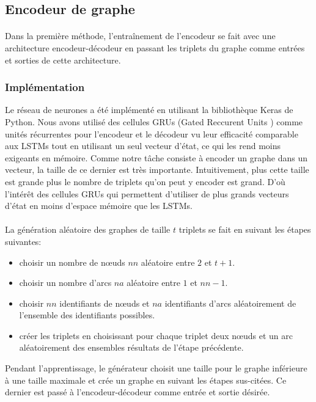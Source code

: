 \subsection{Encodeur de graphe}
\paragraph{}Dans la première méthode, l'entraînement de l'encodeur se fait avec une architecture encodeur-décodeur en passant les triplets du graphe comme entrées et sorties de cette architecture.
\subsubsection{Implémentation}
\par Le réseau de neurones a été implémenté en utilisant la bibliothèque Keras de Python. Nous avons utilisé des cellules GRUs (Gated Reccurent Units \citep{Cho2014}) comme unités récurrentes pour l'encodeur et le décodeur vu leur efficacité comparable aux LSTMs tout en utilisant un seul vecteur d'état, ce qui les rend moins exigeants en mémoire. Comme notre tâche consiste à encoder un graphe dans un vecteur, la taille de ce dernier est très importante. Intuitivement, plus cette taille est grande plus le nombre de triplets qu'on peut y encoder est grand. D'où l'intérêt des cellules GRUs qui permettent d'utiliser de plus grands vecteurs d'état en moins d'espace mémoire que les LSTMs.
\paragraph{}La génération aléatoire des graphes de taille $t$ triplets se fait en suivant les étapes suivantes:
\begin{itemize}
	\item choisir un nombre de n\oe{}uds $nn$ aléatoire entre $2$ et $t+1$.
	\item choisir un nombre d'arcs $na$ aléatoire entre $1$ et $nn-1$.
	\item choisir $nn$ identifiants de n\oe{}uds et $na$ identifiants d'arcs aléatoirement de l'ensemble des identifiants possibles.
	\item créer les triplets en choisissant pour chaque triplet deux n\oe{}uds et un arc aléatoirement des ensembles résultats de l'étape précédente. 
\end{itemize}
\par Pendant l'apprentissage, le générateur choisit une taille pour le graphe inférieure à une taille maximale et crée un graphe en suivant les étapes sus-citées. Ce dernier est passé à l'encodeur-décodeur comme entrée et sortie désirée.
